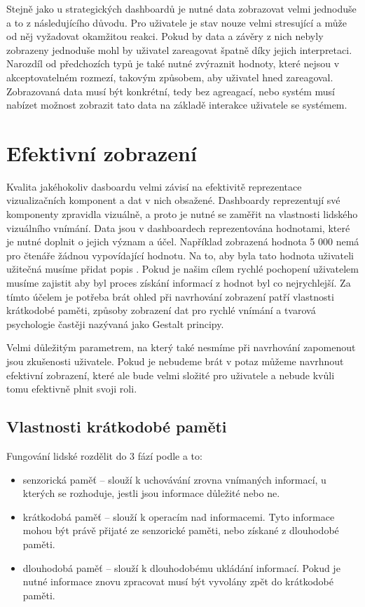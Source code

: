 Stejně jako u strategických dashboardů je nutné data zobrazovat velmi jednoduše a to z následujícího důvodu. Pro uživatele je stav nouze velmi stresující a může od něj vyžadovat okamžitou reakci. Pokud by data a závěry z nich nebyly zobrazeny jednoduše mohl by uživatel zareagovat špatně díky jejich interpretaci. Narozdíl od předchozích typů je také nutné zvýraznit hodnoty, které nejsou v akceptovatelném rozmezí, takovým způsobem, aby uživatel hned zareagoval. Zobrazovaná data musí být konkrétní, tedy bez agreagací, nebo systém musí nabízet možnost zobrazit tato data na základě interakce uživatele se systémem.

\section{Efektivní zobrazení}
Kvalita jakéhokoliv dasboardu velmi závisí na efektivitě reprezentace vizualizačních komponent a dat v nich obsažené. Dashboardy reprezentují své komponenty zpravidla vizuálně, a proto je nutné se zaměřit na vlastnosti lidského vizuálního vnímání. Data jsou v dashboardech reprezentována hodnotami, které je nutné doplnit o jejich význam a účel. Například zobrazená hodnota 5 000 nemá pro čtenáře žádnou vypovídající hodnotu. Na to, aby byla tato hodnota uživateli užitečná musíme přidat popis . Pokud je našim cílem rychlé pochopení uživatelem musíme zajistit aby byl proces získání informací z hodnot byl co nejrychlejší. Za tímto účelem je potřeba brát ohled při navrhování zobrazení patří vlastnosti krátkodobé paměti, způsoby zobrazení dat pro rychlé vnímání a tvarová psychologie častěji nazývaná jako Gestalt principy.

Velmi důležitým parametrem, na který také nesmíme při navrhování zapomenout jsou zkušenosti uživatele. Pokud je nebudeme brát v potaz můžeme navrhnout efektivní zobrazení, které ale bude velmi složité pro uživatele a nebude kvůli tomu efektivně plnit svoji roli. 

\subsection{Vlastnosti krátkodobé paměti}
Fungování lidské rozdělit do 3 fází podle \cite{Baddeley2007WorkingMT} a to:
\begin{itemize}
\item senzorická paměť -- slouží k uchovávání zrovna vnímaných informací, u kterých se rozhoduje, jestli jsou informace důležité nebo ne.

\item krátkodobá paměť -- slouží k operacím nad informacemi. Tyto informace mohou být právě přijaté ze senzorické paměti, nebo získané z dlouhodobé paměti.

\item dlouhodobá paměť -- slouží k dlouhodobému ukládání informací. Pokud je nutné informace znovu zpracovat musí být vyvolány zpět do krátkodobé paměti.
\end{itemize}

